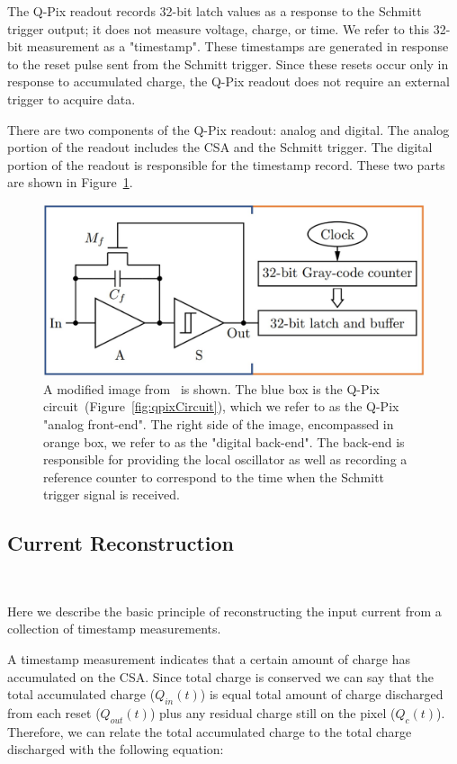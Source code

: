 The Q-Pix readout records 32-bit latch values as a response to the Schmitt trigger output; it does not measure voltage, charge, or time.
We refer to this 32-bit measurement as a "timestamp".
These timestamps are generated in response to the reset pulse sent from the Schmitt trigger.
Since these resets occur only in response to accumulated charge, the Q-Pix readout does not require an external trigger to acquire data.

There are two components of the Q-Pix readout: analog and digital.
The analog portion of the readout includes the CSA and the Schmitt trigger.
The digital portion of the readout is responsible for the timestamp record.
These two parts are shown in Figure~\ref{fig:qpix_frontandbackend}.

\begin{figure}[]
\centering
\includegraphics[width=\textwidth]{images/qpix_circuit_frontandbackend.jpg}
\caption{A modified image from~\citep{qpix:nygren:mei} is shown.
The blue box is the Q-Pix circuit~(Figure~\ref{fig:qpixCircuit}), which we refer to as the Q-Pix "analog front-end".
The right side of the image, encompassed in orange box, we refer to as the "digital back-end".
The back-end is responsible for providing the local oscillator as well as recording a reference counter to correspond to the time when the Schmitt trigger signal is received.
}
\label{fig:qpix_frontandbackend}
\end{figure}

\subsection{Current Reconstruction}~\label{sec:rtds_and_waveforms}

Here we describe the basic principle of reconstructing the input current from a collection of timestamp measurements.

A timestamp measurement indicates that a certain amount of charge has accumulated on the CSA.
Since total charge is conserved we can say that the total accumulated charge ($Q_{in}(t)$) is equal total amount of charge discharged from each reset ($Q_{out}(t)$) plus any residual charge still on the pixel ($Q_{c}(t)$).
Therefore, we can relate the total accumulated charge to the total charge discharged with the following equation:

